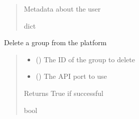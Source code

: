 \documentclass[letterpaper,10pt,english]{sphinxmanual}
\begin{document}
\begin{fulllineitems}
\begin{fulllineitems}
\begin{quote}
\begin{description}
\sphinxAtStartPar
{} \textendash{} Metadata about the user

\sphinxAtStartPar
dict

\end{description}\end{quote}

\end{fulllineitems}


\begin{fulllineitems}
\label{\detokenize{aisquared.platform:aisquared.platform.AISquaredPlatformClient.AISquaredPlatformClient.delete_group}}
\pysigstartsignatures
{}
\pysigstopsignatures
\sphinxAtStartPar
Delete a group from the platform
\begin{quote}\begin{description}
\begin{itemize}
\item {} 
\sphinxAtStartPar
{} () \textendash{} The ID of the group to delete

\item {} 
\sphinxAtStartPar
{} (\sphinxstyleliteralemphasis{\sphinxupquote{ (}}\sphinxstyleliteralemphasis{\sphinxupquote{)}}) \textendash{} The API port to use

\end{itemize}

\sphinxAtStartPar
{} \textendash{} Returns True if successful

\sphinxAtStartPar
bool

\end{description}\end{quote}

\end{fulllineitems}


\end{fulllineitems}
\end{document}
